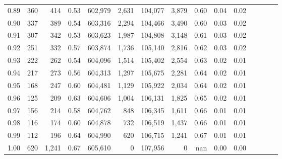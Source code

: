 \begin{tabular}{rrrcrrrrrrrrrrr}
0.89 &     360 &    414 &                                       0.53 &  602,979 &    2,631 &  104,077 &    3,879 &  0.60 &  0.04 &                         0.02 \\
0.90 &     337 &    389 &                                       0.54 &  603,316 &    2,294 &  104,466 &    3,490 &  0.60 &  0.03 &                         0.02 \\
0.91 &     307 &    342 &                                       0.53 &  603,623 &    1,987 &  104,808 &    3,148 &  0.61 &  0.03 &                         0.02 \\
0.92 &     251 &    332 &                                       0.57 &  603,874 &    1,736 &  105,140 &    2,816 &  0.62 &  0.03 &                         0.02 \\
0.93 &     222 &    262 &                                       0.54 &  604,096 &    1,514 &  105,402 &    2,554 &  0.63 &  0.02 &                         0.01 \\
0.94 &     217 &    273 &                                       0.56 &  604,313 &    1,297 &  105,675 &    2,281 &  0.64 &  0.02 &                         0.01 \\
0.95 &     168 &    247 &                                       0.60 &  604,481 &    1,129 &  105,922 &    2,034 &  0.64 &  0.02 &                         0.01 \\
0.96 &     125 &    209 &                                       0.63 &  604,606 &    1,004 &  106,131 &    1,825 &  0.65 &  0.02 &                         0.01 \\
0.97 &     156 &    214 &                                       0.58 &  604,762 &      848 &  106,345 &    1,611 &  0.66 &  0.01 &                         0.01 \\
0.98 &     116 &    174 &                                       0.60 &  604,878 &      732 &  106,519 &    1,437 &  0.66 &  0.01 &                         0.01 \\
0.99 &     112 &    196 &                                       0.64 &  604,990 &      620 &  106,715 &    1,241 &  0.67 &  0.01 &                         0.01 \\
1.00 &     620 &  1,241 &                                       0.67 &  605,610 &        0 &  107,956 &        0 &   nan &  0.00 &                         0.00 \\
\bottomrule
\end{tabular}
